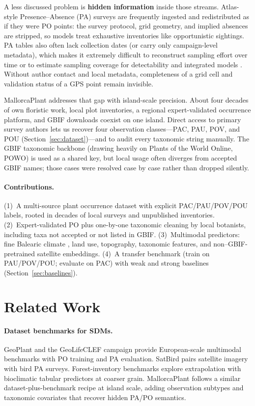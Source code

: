 \documentclass[11pt,letterpaper]{article}
\begin{document}
A less discussed problem is \textbf{hidden information} inside those streams.
Atlas-style Presence--Absence (PA) surveys are frequently ingested and redistributed as if they were PO points: the survey protocol, grid geometry, and implied absences are stripped, so models treat exhaustive inventories like opportunistic sightings.
PA tables also often lack collection dates (or carry only campaign-level metadata), which makes it extremely difficult to reconstruct sampling effort over time or to estimate sampling coverage for detectability and integrated models \citep{isaac2020data,fletcher2019practical}.
Without author contact and local metadata, completeness of a grid cell and validation status of a GPS point remain invisible.

MallorcaPlant addresses that gap with island-scale precision.
About four decades of own floristic work, local plot inventories, a regional expert-validated occurrence platform, and GBIF downloads coexist on one island.
Direct access to primary survey authors lets us recover four observation classes---PAC, PAU, POV, and POU (Section~\ref{sec:dataset})---and to audit every taxonomic string manually.
The GBIF taxonomic backbone (drawing heavily on Plants of the World Online, POWO) is used as a shared key, but local usage often diverges from accepted GBIF names; those cases were resolved case by case rather than dropped silently.

\paragraph{Contributions.}
(1)~A multi-source plant occurrence dataset with explicit PAC/PAU/POV/POU labels, rooted in decades of local surveys and unpublished inventories.
(2)~Expert-validated PO plus one-by-one taxonomic cleaning by local botanists, including taxa not accepted or not listed in GBIF.
(3)~Multimodal predictors: fine Balearic climate \citep{bahuet2026}, land use, topography, taxonomic features, and non--GBIF-pretrained satellite embeddings.
(4)~A transfer benchmark (train on PAU/POV/POU; evaluate on PAC) with weak and strong baselines (Section~\ref{sec:baselines}).


\section{Related Work}
\label{sec:related}

\paragraph{Dataset benchmarks for SDMs.}
GeoPlant \citep{geoplant2024} and the GeoLifeCLEF campaign provide European-scale multimodal benchmarks with PO training and PA evaluation.
SatBird pairs satellite imagery with bird PA surveys.
Forest-inventory benchmarks explore extrapolation with bioclimatic tabular predictors at coarser grain.
MallorcaPlant follows a similar dataset-plus-benchmark recipe at island scale, adding observation subtypes and taxonomic covariates that recover hidden PA/PO semantics.
\end{document}
